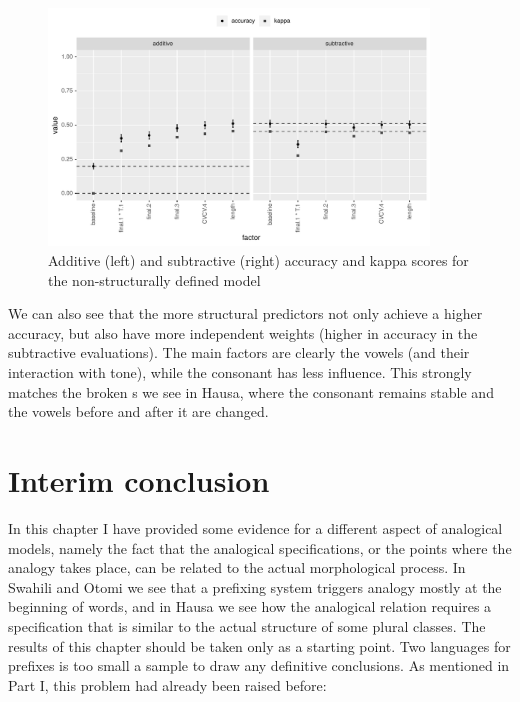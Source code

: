\begin{figure}
    \centering
    \includegraphics[width=0.9\textwidth]{./figures/hausa/nostruc-overall.pdf}
    \caption{Additive (left) and subtractive (right) accuracy and kappa scores for the non-structurally defined model}\label{fig:nostruc-overall}
\end{figure}

\largerpage
We can also see that the more structural predictors not only achieve a higher accuracy, but also have more independent weights (higher in accuracy in the subtractive evaluations). The main factors are clearly the vowels (and their interaction with tone), while the consonant has less influence. This strongly matches the broken s we see in Hausa, where the consonant remains stable and the vowels before and after it are changed.


\section{Interim conclusion}

In this chapter I have provided some evidence for a different aspect of analogical models, namely the fact that the analogical specifications, or the points where the analogy takes place, can be related to the actual morphological process. In Swahili and Otomi we see that a prefixing system triggers analogy mostly at the beginning of words, and in Hausa we see how the analogical relation requires a specification that is similar to the actual structure of some plural classes. The results of this chapter should be taken only as a starting point. Two languages for prefixes is too small a sample to draw any definitive conclusions. As mentioned in Part I, this problem had already been raised before:

